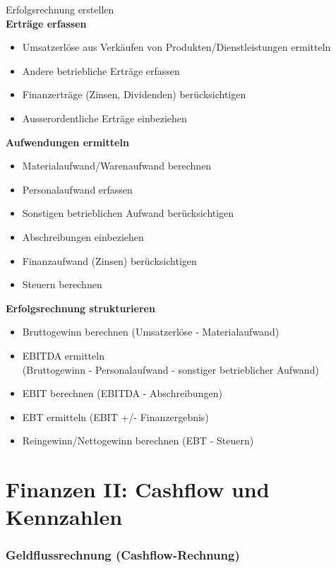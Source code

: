 \begin{KR}{Erfolgsrechnung erstellen}\\
\textbf{Erträge erfassen}
\begin{itemize}
    \item Umsatzerlöse aus Verkäufen von Produkten/Dienstleistungen ermitteln
    \item Andere betriebliche Erträge erfassen
    \item Finanzerträge (Zinsen, Dividenden) berücksichtigen
    \item Ausserordentliche Erträge einbeziehen
\end{itemize}

\textbf{Aufwendungen ermitteln}
\begin{itemize}
    \item Materialaufwand/Warenaufwand berechnen
    \item Personalaufwand erfassen
    \item Sonstigen betrieblichen Aufwand berücksichtigen
    \item Abschreibungen einbeziehen
    \item Finanzaufwand (Zinsen) berücksichtigen
    \item Steuern berechnen
\end{itemize}

\textbf{Erfolgsrechnung strukturieren}
\begin{itemize}
    \item Bruttogewinn berechnen (Umsatzerlöse - Materialaufwand)
    \item EBITDA ermitteln \\ (Bruttogewinn - Personalaufwand - sonstiger betrieblicher Aufwand)
    \item EBIT berechnen (EBITDA - Abschreibungen)
    \item EBT ermitteln (EBIT +/- Finanzergebnis)
    \item Reingewinn/Nettogewinn berechnen (EBT - Steuern)
\end{itemize}
\end{KR}

\raggedcolumns

\section{Finanzen II: Cashflow und Kennzahlen}

\subsubsection{Geldflussrechnung (Cashflow-Rechnung)}

